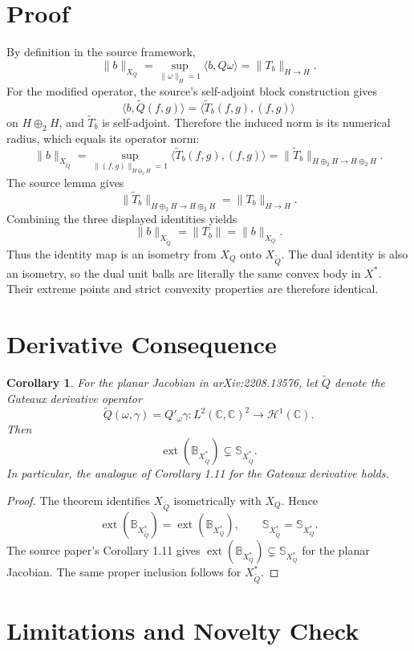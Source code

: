 \documentclass[11pt]{article}
\newtheorem{corollary}{Corollary}
\newcommand{\B}{\mathbb B}
\newcommand{\Sph}{\mathbb S}
\newcommand{\C}{\mathbb C}
\newcommand{\ext}{\operatorname{ext}}
\begin{document}
\section*{Proof}

By definition in the source framework,
\[
  \|b\|_{X_Q}
  =
  \sup_{\|\omega\|_H=1}\langle b,Q\omega\rangle
  =
  \|T_b\|_{H\to H}.
\]
For the modified operator, the source's self-adjoint block construction gives
\[
  \langle b,\widetilde Q(f,g)\rangle
  =
  \langle \widetilde T_b(f,g),(f,g)\rangle
\]
on \(H\oplus_2 H\), and \(\widetilde T_b\) is self-adjoint.  Therefore the
induced norm is its numerical radius, which equals its operator norm:
\[
  \|b\|_{X_{\widetilde Q}}
  =
  \sup_{\|(f,g)\|_{H\oplus_2H}=1}
  \langle \widetilde T_b(f,g),(f,g)\rangle
  =
  \|\widetilde T_b\|_{H\oplus_2 H\to H\oplus_2H}.
\]
The source lemma gives
\[
  \|\widetilde T_b\|_{H\oplus_2H\to H\oplus_2H}
  =
  \|T_b\|_{H\to H}.
\]
Combining the three displayed identities yields
\[
  \|b\|_{X_{\widetilde Q}}=\|T_b\|=\|b\|_{X_Q}.
\]
Thus the identity map is an isometry from \(X_Q\) onto \(X_{\widetilde Q}\).
The dual identity is also an isometry, so the dual unit balls are literally
the same convex body in \(X^*\).  Their extreme points and strict convexity
properties are therefore identical.

\section*{Derivative Consequence}

\begin{corollary}
For the planar Jacobian in arXiv:2208.13576, let \(\widetilde Q\) denote the
Gateaux derivative operator
\[
  \widetilde Q(\omega,\gamma)=Q'_\omega\gamma:
  L^2(\C,\C)^2\to\mathcal H^1(\C).
\]
Then
\[
  \ext(\B_{X_{\widetilde Q}^*})\subsetneq \Sph_{X_{\widetilde Q}^*}.
\]
In particular, the analogue of Corollary 1.11 for the Gateaux derivative
holds.
\end{corollary}

\begin{proof}
The theorem identifies \(X_{\widetilde Q}\) isometrically with \(X_Q\).  Hence
\[
  \ext(\B_{X_{\widetilde Q}^*})=\ext(\B_{X_Q^*}),
  \qquad
  \Sph_{X_{\widetilde Q}^*}=\Sph_{X_Q^*}.
\]
The source paper's Corollary 1.11 gives
\(\ext(\B_{X_Q^*})\subsetneq \Sph_{X_Q^*}\) for the planar Jacobian.  The same
proper inclusion follows for \(X_{\widetilde Q}^*\).
\end{proof}

\section*{Limitations and Novelty Check}
\end{document}
